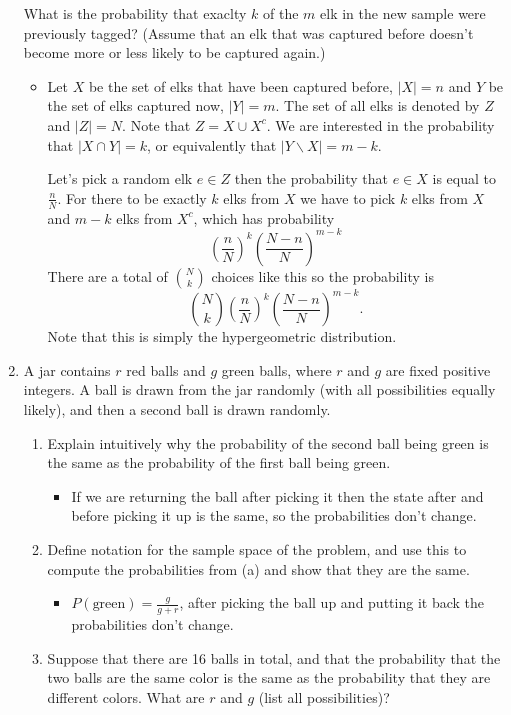 \documentclass{article}
\begin{document}
\begin{enumerate}
	What is the probability that exaclty $k$ of the $m$ elk in the new sample were previously tagged? (Assume that an elk that was captured before doesn’t become more or less likely to be captured again.)
		\begin{itemize}
			\item Let $X$ be the set of elks that have been captured before, $|X| = n$ and $Y$ be the set of elks captured now, $|Y| = m$. The set of all elks is denoted by $Z$ and $|Z| = N$. Note that $Z = X \cup X^c$. We are interested in the probability that $|X \cap Y| = k$, or equivalently that $|Y \backslash X| = m - k$.

			Let's pick a random elk $e \in Z$ then the probability that $e \in X$ is equal to $\frac{n}{N}$. For there to be exactly $k$ elks from $X$ we have to pick $k$ elks from $X$ and $m - k$ elks from $X^c$, which has probability
			$$
			\left(\frac{n}{N}\right)^k \left(\frac{N - n}{N}\right)^{m - k}
			$$
			There are a total of $\binom{N}{k}$ choices like this so the probability is
			$$
			\binom{N}{k} \left(\frac{n}{N}\right)^k \left(\frac{N - n}{N}\right)^{m - k}.
			$$
			Note that this is simply the hypergeometric distribution.
		\end{itemize}
	\item A jar contains $r$ red balls and $g$ green balls, where $r$ and $g$ are fixed positive integers. A ball is drawn from the jar randomly (with all possibilities equally likely), and then a second ball is drawn randomly.
		\begin{enumerate}
			\item Explain intuitively why the probability of the second ball being green is the same as the probability of the first ball being green.
				\begin{itemize}
					\item If we are returning the ball after picking it then the state after and before picking it up is the same, so the probabilities don't change.
				\end{itemize}
			\item Define notation for the sample space of the problem, and use this to compute the probabilities from (a) and show that they are the same.
				\begin{itemize}
					\item $P(\text{green}) = \frac{g}{g + r}$, after picking the ball up and putting it back the probabilities don't change.
				\end{itemize}
			\item Suppose that there are 16 balls in total, and that the probability that the two balls are the same color is the same as the probability that they are different colors. What are $r$ and $g$ (list all possibilities)?

\end{enumerate}
\end{enumerate}
\end{document}
